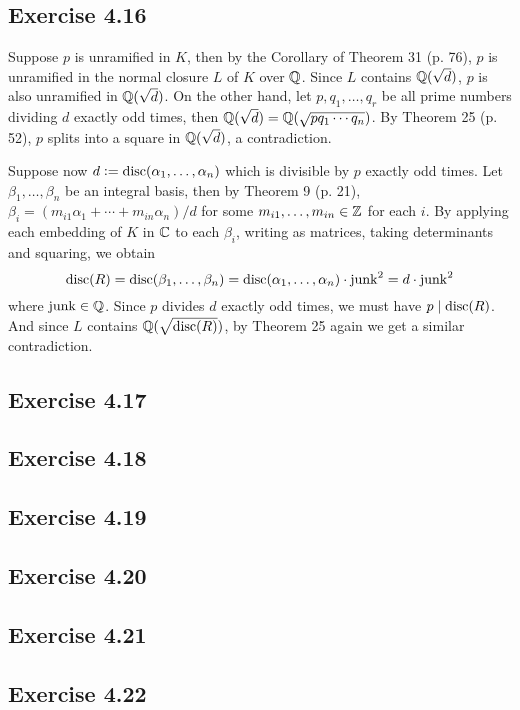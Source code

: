 \documentclass[../Marcus.tex]{subfiles}
\begin{document}
\subsection*{Exercise 4.16}

Suppose $p$ is unramified in $K$, then by the Corollary of Theorem 31 (p. 76), $p$ is unramified in the normal closure $L$ of $K$ over $\mathbb{Q}$. Since $L$ contains $\mathbb{Q}(\sqrt{d})$, $p$ is also unramified in $\mathbb{Q}(\sqrt{d})$. On the other hand, let $p,q_1,\ldots,q_r$ be all prime numbers dividing $d$ exactly odd times, then $\mathbb{Q}(\sqrt{d})=\mathbb{Q}(\sqrt{pq_1\cdots q_n})$. By Theorem 25 (p. 52), $p$ splits into a square in $\mathbb{Q}(\sqrt{d})$, a contradiction.

Suppose now $d:=\operatorname{disc}(\alpha_1,\ldots,\alpha_n)$ which is divisible by $p$ exactly odd times. Let $\beta_1,\ldots,\beta_n$ be an integral basis, then by Theorem 9 (p. 21), $\beta_i=(m_{i1}\alpha_1+\cdots+m_{in}\alpha_n)/d$ for some $m_{i1},\ldots,m_{in}\in\mathbb{Z}$ for each $i$. By applying each embedding of $K$ in $\mathbb{C}$ to each $\beta_i$, writing as matrices, taking determinants and squaring, we obtain $$\operatorname{disc}(R)=\operatorname{disc}(\beta_1,\ldots,\beta_n)=\operatorname{disc}(\alpha_1,\ldots,\alpha_n)\cdot\operatorname{junk}^2=d\cdot\operatorname{junk}^2$$ where $\operatorname{junk}\in\mathbb{Q}$. Since $p$ divides $d$ exactly odd times, we must have $p\mid\operatorname{disc}(R)$. And since $L$ contains $\mathbb{Q}(\sqrt{\operatorname{disc}(R)})$, by Theorem 25 again we get a similar contradiction.

\subsection*{Exercise 4.17}

\subsection*{Exercise 4.18}

\subsection*{Exercise 4.19}

\subsection*{Exercise 4.20}

\subsection*{Exercise 4.21}

\subsection*{Exercise 4.22}
\end{document}
